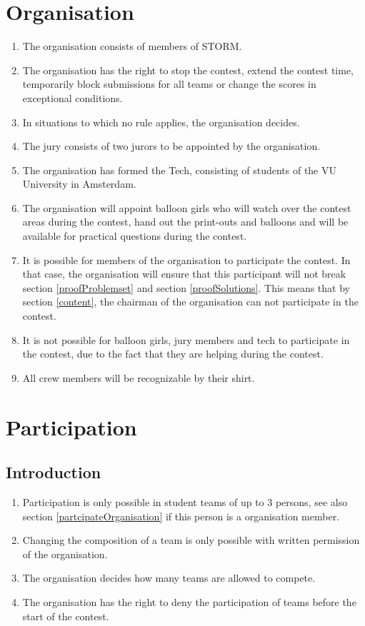\documentclass[11pt]{report}
\begin{document}
\chapter{Organisation}
\begin{enumerate}[label=\bfseries 2.\arabic*]
\item The organisation consists of members of STORM.
\item The organisation has the right to stop the contest, extend the contest time, temporarily block submissions for all teams or change the scores in exceptional conditions.
\item \label{noRules} In situations to which no rule applies, the organisation decides.
\item The jury consists of two jurors to be appointed by the organisation.
\item The organisation has formed the Tech, consisting of students of the VU University in Amsterdam.
\item The organisation will appoint balloon girls who will watch over the contest areas during the contest, hand out the print-outs and balloons and will be available for practical questions during the contest.
\item \label{partcipateOrganisation} It is possible for members of the organisation to participate the contest. In that case, the organisation will ensure that this participant will not break section \ref{proofProblemset} and section \ref{proofSolutions}. This means that by section \ref{content}, the chairman of the organisation can not participate in the contest.
\item It is not possible for balloon girls, jury members and tech to participate in the contest, due to the fact that they are helping during the contest.
\item All crew members will be recognizable by their shirt.
\end{enumerate}

\chapter{Participation}
\section{Introduction}
\begin{enumerate}[label=\bfseries 3.1\arabic*]
\item Participation is only possible in student teams of up to $3$ persons, see also section \ref{partcipateOrganisation} if this person is a organisation member.
\item Changing the composition of a team is only possible with written permission of the organisation.
\item The organisation decides how many teams are allowed to compete.
\item The organisation has the right to deny the participation of teams before the start of the contest.
\end{enumerate}
\end{document}
